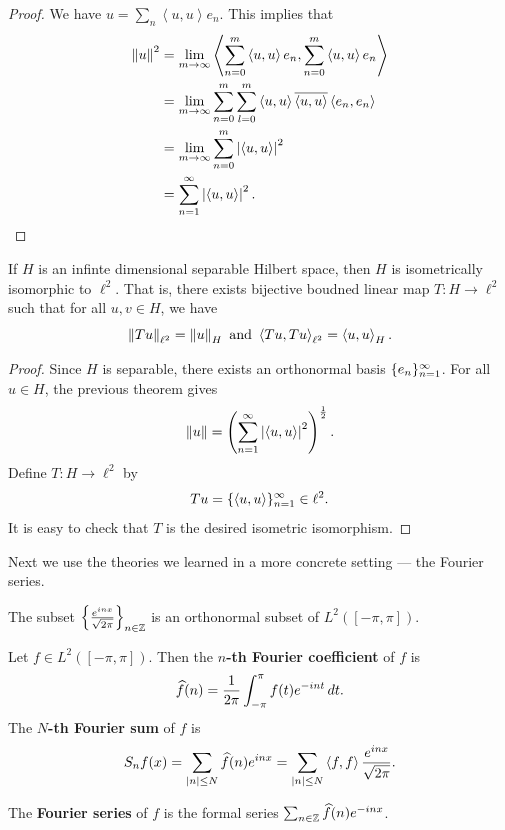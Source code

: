 \documentclass[a4paper]{article}
\renewcommand{\braket}[2]{\left\langle #1, #1 \right\rangle}
\begin{document}
\begin{proof}
  We have $u = \sum_n \braket{u}{e_n} e_n$. This implies that
  \[
    \begin{aligned}
      \norm{u}^2
       & = \lim_{m \to \infty} \braket{\sum_{n=0}^m \braket{u}{e_n}
                                 e_n}{\sum_{l=0}^m \braket{u}{e_l} e_l} \\
       & = \lim_{m \to \infty} \sum_{n=0}^m \sum_{l=0}^m
      \braket{u}{e_n} \bar{\braket{u}{e_l}} \braket{e_n}{e_l}           \\
       & = \lim_{m \to \infty} \sum_{n=0}^m \abs{\braket{u}{e_n}}^2     \\
       & = \suminfn \abs{\braket{u}{e_n}}^2.
    \end{aligned}
  \]
\end{proof}

\begin{thm}
  If $H$ is an infinte dimensional separable Hilbert space,
  then $H$ is isometrically isomorphic to $\ell^2$.
  That is, there exists bijective boudned linear map
  $T : H \to \ell^2$ such that
  for all $u, v \in H$, we have
  \[
    \norm{T u}_{\ell^2} = \norm{u}_H
    \text{ and }
    \braket{T u}{T v}_{\ell^2} = \braket{u}{v}_H.
  \]
\end{thm}

\begin{proof}
  Since $H$ is separable, there exists an orthonormal basis
  $\{ e_n \}_{n=1}^\infty$.
  For all $u \in H$, the previous theorem gives
  \[
    \norm{u} = \left( \suminfn \abs{\braket{u}{e_n}}^2 \right)^{\frac{1}{2}}.
  \]
  Define $T : H \to \ell^2$ by
  \[
    T u = \seqinfn{\braket{u}{e_n}} \in \ell^2.
  \]
  It is easy to check that $T$ is the desired isometric
  isomorphism.
\end{proof}

Next we use the theories we learned in a more concrete
setting --- the Fourier series.

\begin{thm}
  The subset $\left\{ \frac{e^{i n x}}{\sqrt{2 \pi}} \right\}_{n \in \mathbb{Z}}$
  is an orthonormal subset of $L^2([-\pi, \pi])$.
\end{thm}

\begin{defi}
  Let $f \in L^2([- \pi, \pi])$. Then the \textbf{$n$-th
    Fourier coefficient} of $f$ is
  \[
    \widehat{f}(n) = \frac{1}{2\pi} \int_{-\pi}^\pi f(t)
    e^{- i n t} \, d t.
  \]
  The \textbf{$N$-th Fourier sum} of $f$ is
  \[
    S_n f(x) = \sum_{\abs{n} \leq N} \hat{f}(n) e^{inx}
    = \sum_{\abs{n} \leq N} \braket{f}{\frac{e^{int}}{\sqrt{2\pi}}}
    \frac{e^{inx}}{\sqrt{2\pi}}.
  \]

  The \textbf{Fourier series} of $f$ is the formal
  series $\sum_{n \in \mathbb{Z}} \widehat{f} (n) e^{-inx}$.
\end{defi}
\end{document}
